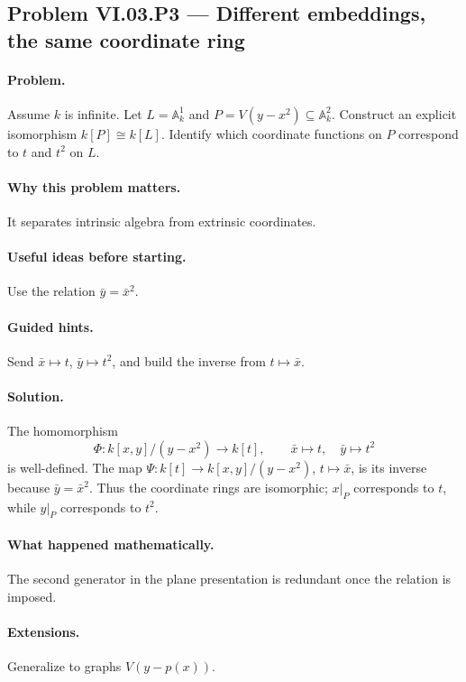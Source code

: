 \subsection*{Problem VI.03.P3 --- Different embeddings, the same coordinate ring}
\label{prob:vi03-p3}
\paragraph{Problem.}
Assume \(k\) is infinite.  Let \(L=\mathbb A_k^1\) and \(P=V(y-x^2)\subseteq\mathbb A_k^2\).
Construct an explicit isomorphism \(k[P]\cong k[L]\).  Identify which coordinate
functions on \(P\) correspond to \(t\) and \(t^2\) on \(L\).
\ifdefined\FullProblemDossiers
\paragraph{Why this problem matters.} It separates intrinsic algebra from extrinsic coordinates.
\paragraph{Useful ideas before starting.} Use the relation \(\bar y=\bar x^2\).
\paragraph{Guided hints.} Send \(\bar x\mapsto t\), \(\bar y\mapsto t^2\), and build the inverse from \(t\mapsto\bar x\).
\paragraph{Solution.}
The homomorphism
\[
\Phi:k[x,y]/(y-x^2)\to k[t],\qquad \bar x\mapsto t,\quad\bar y\mapsto t^2
\]
is well-defined.  The map \(\Psi:k[t]\to k[x,y]/(y-x^2)\), \(t\mapsto\bar x\), is its
inverse because \(\bar y=\bar x^2\).  Thus the coordinate rings are isomorphic; \(x|_P\)
corresponds to \(t\), while \(y|_P\) corresponds to \(t^2\).
\paragraph{What happened mathematically.} The second generator in the plane presentation is redundant once the relation is imposed.
\paragraph{Extensions.} Generalize to graphs \(V(y-p(x))\).
\fi
